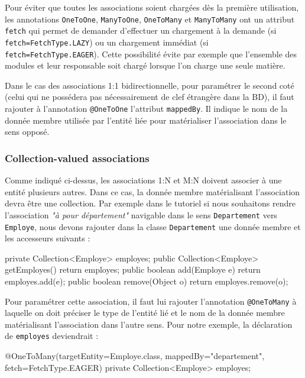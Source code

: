 \documentclass[a4paper,11pt]{article}
\begin{document}
Pour éviter que toutes les associations soient chargées dès la première utilisation, les annotations \texttt{OneToOne}, 
\texttt{ManyToOne}, \texttt{OneToMany} et \texttt{ManyToMany} ont un attribut \texttt{fetch} qui permet de demander 
d'effectuer un chargement à la demande (si \texttt{fetch=FetchType.LAZY}) ou un chargement immédiat 
(si \texttt{fetch=FetchType.EAGER}). Cette possibilité évite par exemple que l'ensemble des modules et leur responsable 
soit chargé lorsque l'on charge une seule matière.

Dans le cas des associations 1:1 bidirectionnelle, pour paramétrer le second coté (celui qui ne possédera pas nécessairement 
de clef étrangère dans la BD), il faut rajouter à l'annotation \texttt{@OneToOne} l'attribut \texttt{mappedBy}. Il indique 
le nom de la donnée membre utilisée par l'entité liée pour matérialiser l'association dans le sens opposé.

\subsubsection{Collection-valued associations}
Comme indiqué ci-dessus, les associations 1:N et M:N doivent associer à une entité plusieurs autres. Dans ce cas, la 
donnée membre matérialisant l'association devra être une collection. Par exemple dans le tutoriel si nous souhaitons 
rendre l'association \textit{"à pour département"} navigable dans le sens \texttt{Departement} vers \texttt{Employe}, 
nous devons rajouter dans la classe \texttt{Departement} une donnée membre et les accesseurs suivants :

\begin{code_java}
private Collection<Employe> employes;
public Collection<Employe> getEmployes() {
	return employes;
}
public boolean add(Employe e) {
	return employes.add(e);
}
public boolean remove(Object o) {
		return employes.remove(o);
}
\end{code_java}

Pour paramétrer cette association, il faut lui rajouter l'annotation \texttt{@OneToMany} à laquelle on doit 
préciser le type de l'entité lié et le nom de la donnée membre matérialisant l'association dans l'autre sens. Pour notre
exemple, la déclaration de \texttt{employes} deviendrait :

\begin{code_java}
@OneToMany(targetEntity=Employe.class, mappedBy="departement", fetch=FetchType.EAGER)
private Collection<Employe> employes;
\end{code_java} 
\end{document}
